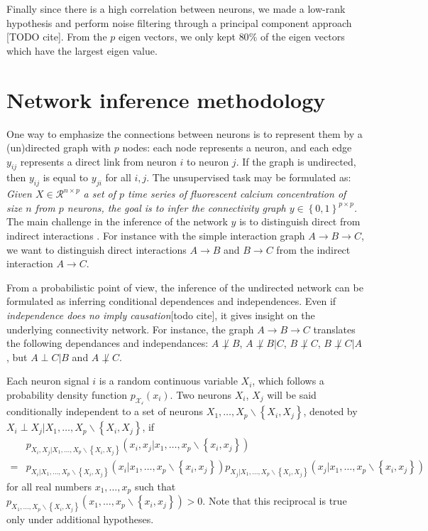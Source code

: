 \documentclass[wcp]{jmlr}
\begin{document}
Finally since there is a high correlation between neurons, we made a
low-rank hypothesis and perform noise filtering through a principal component
approach [TODO cite]. From the $p$ eigen vectors, we only kept $80\%$ of
the eigen vectors which have the largest eigen value.

\section{Network inference methodology}
\label{sec:inference}
One way to emphasize the connections between neurons is to represent them by a
(un)directed graph with $p$ nodes: each node represents a neuron, and each
edge $y_{ij}$ represents a direct link from neuron  $i$ to neuron $j$. If the
graph is undirected, then $y_{ij}$ is equal to $y_{ji}$  for all $i,j$.
The unsupervised task may be formulated as:
\textit{Given $X \in \mathcal{R}^{n \times p}$  a set of $p$ time series of
fluorescent calcium concentration of size $n$ from $p$ neurons, the goal is to
infer the connectivity graph $y \in \left\{0, 1\right\}^{p \times p}$.}
The main challenge in the inference of the network $y$
is to distinguish direct from indirect interactions \cite{de2004discovery}.
For instance with the simple interaction graph $A \rightarrow B \rightarrow C$,
we want to distinguish direct interactions $A \rightarrow B$ and $B \rightarrow C$
from the indirect interaction $A \rightarrow C$.

From a probabilistic point of view, the inference of the undirected network
can be formulated as inferring conditional dependences and
independences.  Even if \textit{independence
does no imply causation}[todo cite], it gives insight on the underlying connectivity
network. For instance, the graph $A \rightarrow B \rightarrow C$ translates the
following dependances and independances: $A \not\perp B$, $A \not\perp B | C$,
$B \not\perp C$, $B \not\perp C | A$, but $A \perp C | B$ and  $A \not\perp C$.

Each neuron signal $i$ is a random continuous variable $X_i$,
which follows a probability density function $p_\mathcal{X_i}(x_i)$.
Two neurons $X_i$, $X_j$ will be said conditionally independent
to a set of neurons $X_1,\ldots,X_p \backslash \left\{X_i, X_j\right\}$, denoted
by  $X_i \perp X_j | X_1,\ldots,X_p \backslash \left\{X_i, X_j\right\}$,  if
\begin{align*}
&p_{X_i, X_j | X_1,\ldots,X_p \backslash \left\{X_i, X_j\right\}}
    (x_i, x_j | x_1,\ldots,x_p \backslash \left\{x_i, x_j\right\}) \\
=&p_{X_i | X_1,\ldots,X_p \backslash \left\{X_i, X_j\right\}}
    (x_i | x_1,\ldots,x_p \backslash \left\{x_i, x_j\right\})
p_{X_j | X_1,\ldots,X_p \backslash \left\{X_i, X_j\right\}}
    (x_j | x_1,\ldots,x_p \backslash \left\{x_i, x_j\right\})
\end{align*}
for all real numbers $x_1,\ldots,x_p $ such that
$p_{X_1,\ldots,X_p \backslash \left\{X_i, X_j\right\}}
(x_1,\ldots,x_p \backslash \left\{x_i, x_j\right\}) > 0$. Note that this
reciprocal is true only under additional hypotheses.
\end{document}
